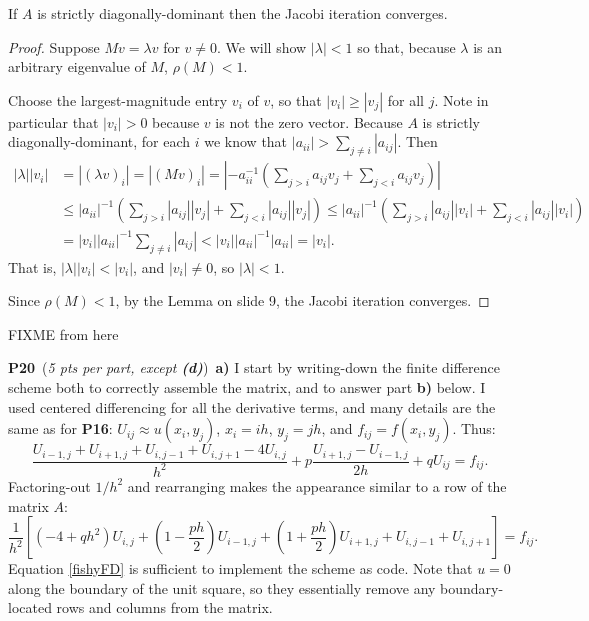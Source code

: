 \documentclass[11pt]{amsart}
\newcommand{\probpts}[2]{\bigskip\noindent\large \textbf{#1} \normalsize \,(\emph{#2})\,}
\newcommand{\ppart}[1]{\quad \textbf{#1)} }
\begin{document}
\medskip
If $A$ is strictly diagonally-dominant then the Jacobi iteration converges.

\begin{proof} Suppose $M v = \lambda v$ for $v\ne 0$.  We will show $|\lambda|<1$ so that, because $\lambda$ is an arbitrary eigenvalue of $M$, $\rho(M)<1$.

Choose the largest-magnitude entry $v_i$ of $v$, so that $|v_i| \ge |v_j|$ for all $j$.  Note in particular that $|v_i| > 0$ because $v$ is not the zero vector.  Because $A$ is strictly diagonally-dominant, for each $i$ we know that $|a_{ii}| > \sum_{j\ne i} |a_{ij}|$.  Then
\begin{align*}
|\lambda| |v_i| &= |(\lambda v)_i| = |(M v)_i| = \left|- a_{ii}^{-1} \left(\sum_{j>i} a_{ij} v_j + \sum_{j<i} a_{ij} v_j\right)\right| \\
  &\le |a_{ii}|^{-1} \left(\sum_{j>i} |a_{ij}| |v_j| + \sum_{j<i} |a_{ij}| |v_j|\right) \le |a_{ii}|^{-1} \left(\sum_{j>i} |a_{ij}| |v_i| + \sum_{j<i} |a_{ij}| |v_i|\right) \\
  &= |v_i| |a_{ii}|^{-1} \sum_{j\ne i} |a_{ij}| < |v_i| |a_{ii}|^{-1} |a_{ii}| = |v_i|.
\end{align*}
That is, $|\lambda| |v_i| < |v_i|$, and $|v_i|\ne 0$, so $|\lambda|<1$.

Since $\rho(M)<1$, by the Lemma on slide 9, the Jacobi iteration converges.
\end{proof}


FIXME from here

\probpts{P20}{5 pts per part, except \emph{\textbf{(d)}}}  \ppart{a}  I start by writing-down the finite difference scheme both to correctly assemble the matrix, and to answer part \textbf{b)} below.  I used centered differencing for all the derivative terms, and many details are the same as for \textbf{P16}: $U_{ij} \approx u(x_i,y_j)$, $x_i = i h$, $y_j = j h$, and $f_{ij} = f(x_i,y_j)$.  Thus:
\begin{equation*}
\frac{U_{i-1,j} + U_{i+1,j} + U_{i,j-1} + U_{i,j+1} - 4 U_{i,j}}{h^2} + p \frac{U_{i+1,j} - U_{i-1,j}}{2h} + q U_{ij} = f_{ij}.
\end{equation*}
Factoring-out $1/h^2$ and rearranging makes the appearance similar to a row of the matrix $A$:
\begin{equation}
\frac{1}{h^2} \left[(-4 + q h^2) U_{i,j} + \left(1 - \frac{p h}{2}\right) U_{i-1,j} + \left(1 + \frac{p h}{2}\right) U_{i+1,j} + U_{i,j-1} + U_{i,j+1}\right] = f_{ij}.
\label{fishyFD}
\end{equation}
Equation \eqref{fishyFD} is sufficient to implement the scheme as code.  Note that $u=0$ along the boundary of the unit square, so they essentially remove any boundary-located rows and columns from the matrix.
\end{document}
